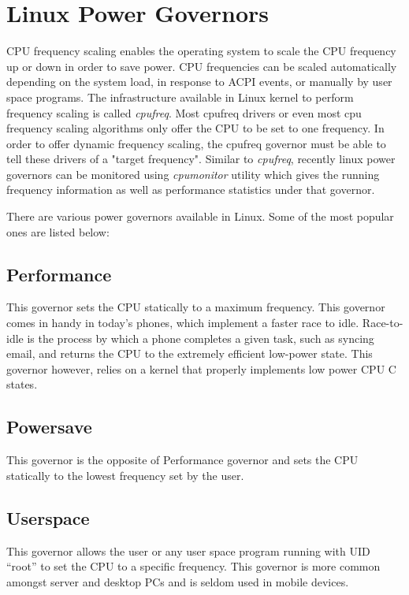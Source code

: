 \section{Linux Power Governors}\label{sec:linux-powergov}

CPU frequency scaling enables the operating system to scale the CPU frequency up or down in order to save power. CPU frequencies can be scaled automatically depending on the system load, in response to ACPI events, or manually by user space programs. The infrastructure available in Linux kernel to perform frequency scaling is called \emph{cpufreq}. Most cpufreq drivers or even most cpu frequency scaling algorithms only offer the CPU to be set to one frequency. In order to offer dynamic frequency scaling, the cpufreq governor must be able to tell these drivers of a "target frequency". Similar to \emph{cpufreq}, recently linux power governors can be monitored using \emph{cpumonitor} utility which gives the running frequency information as well as performance statistics under that governor.

There are various power governors available in Linux. Some of the most popular ones are listed below:
\subsection{Performance}
This governor sets the CPU statically to a maximum frequency. This governor comes in handy in today’s phones, which implement a faster race to idle. Race-to-idle is the process by which a phone completes a given task, such as syncing email, and returns the CPU to the extremely efficient low-power state. This governor however, relies on a kernel that properly implements low power CPU C states.

\subsection{Powersave}
This governor is the opposite of Performance governor and sets the CPU statically to the lowest frequency set by the user.

\subsection{Userspace}
This governor allows the user or any user space program running with UID “root” to set the CPU to a specific frequency. This governor is more common amongst server and desktop PCs and is seldom used in mobile devices.

